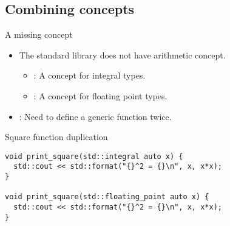 \subsection{Combining concepts}

\begin{frame}[t,fragile]{A missing concept}
\begin{itemize}
  \item The standard library does not have arithmetic concept.
    \begin{itemize}
      \item {}: A concept for integral types.
      \item {}: A concept for floating point types.
    \end{itemize}

  \item {}: Need to define a generic function twice.
\end{itemize}


\begin{block}{Square function duplication}
\begin{lstlisting}
void print_square(std::integral auto x) {
  std::cout << std::format("{}^2 = {}\n", x, x*x);
}

void print_square(std::floating_point auto x) {
  std::cout << std::format("{}^2 = {}\n", x, x*x);
}
\end{lstlisting}
\end{block}
\end{frame}

